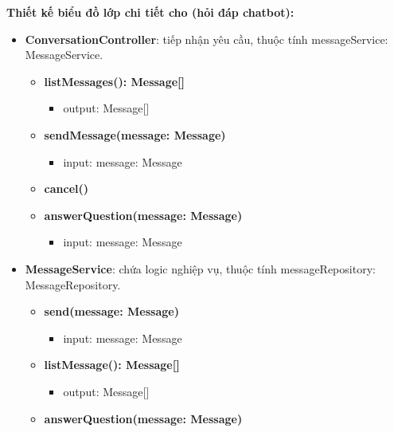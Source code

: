 \textbf{Thiết kế biểu đồ lớp chi tiết cho  (hỏi đáp chatbot):}
\begin{itemize}[label=\textbullet, itemsep=0.4em]
  \item \textbf{ConversationController}: tiếp nhận yêu cầu, thuộc tính messageService: MessageService.
  \begin{itemize}[label=$\circ$, itemsep=0.2em, leftmargin=1.5em]
    \item \textbf{listMessages(): Message[]}
    \begin{itemize}[label=$\blacksquare$, itemsep=0.1em, leftmargin=1.5em]
      \item output: Message[]
    \end{itemize}
    \item \textbf{sendMessage(message: Message)}
    \begin{itemize}[label=$\blacksquare$, itemsep=0.1em, leftmargin=1.5em]
      \item input: message: Message
    \end{itemize}
    \item \textbf{cancel()}
    \item \textbf{answerQuestion(message: Message)}
    \begin{itemize}[label=$\blacksquare$, itemsep=0.1em, leftmargin=1.5em]
      \item input: message: Message
    \end{itemize}
  \end{itemize}
  \item \textbf{MessageService}: chứa logic nghiệp vụ, thuộc tính messageRepository: MessageRepository.
  \begin{itemize}[label=$\circ$, itemsep=0.2em, leftmargin=1.5em]
    \item \textbf{send(message: Message)}
    \begin{itemize}[label=$\blacksquare$, itemsep=0.1em, leftmargin=1.5em]
      \item input: message: Message
    \end{itemize}
    \item \textbf{listMessage(): Message[]}
    \begin{itemize}[label=$\blacksquare$, itemsep=0.1em, leftmargin=1.5em]
      \item output: Message[]
    \end{itemize}
    \item \textbf{answerQuestion(message: Message)}
    \begin{itemize}[label=$\blacksquare$, itemsep=0.1em, leftmargin=1.5em]

\end{itemize}
\end{itemize}
\end{itemize}

